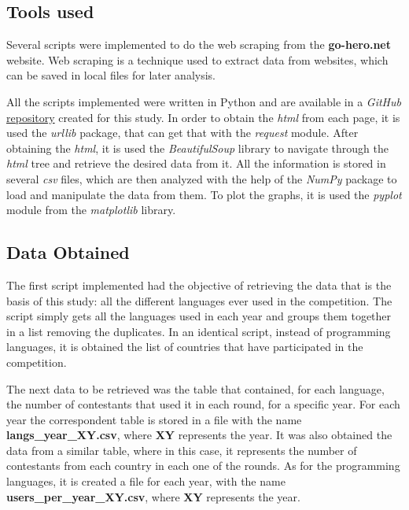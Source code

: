 \documentclass{article}
\begin{document}
\begin{multicols*}{2}
\subsection{Tools used}

Several scripts were implemented to do the web scraping from the \textbf{go-hero.net} website. Web scraping is a technique used to extract data from websites\cite{web_sc}, which can be saved in local files for later analysis.  %

All the scripts implemented were written in Python and are available in a \textit{GitHub} \href{https://github.com/Tiaghoul/iic-GoogleJamStudy}{repository} created for this study. In order to obtain the \textit{html} from each page, it is used the \textit{urllib} package, that can get that with the \textit{request} module. After obtaining the \textit{html}, it is used the \textit{BeautifulSoup} library to navigate through the \textit{html} tree and retrieve the desired data from it. All the information is stored in several \textit{csv} files, which are then analyzed with the help of the \textit{NumPy} package to load and manipulate the data from them. To plot the graphs, it is used the \textit{pyplot} module from the \textit{matplotlib} library.


\subsection{Data Obtained}

The first script implemented had the objective of retrieving the data that is the basis of this study: all the different languages ever used in the competition. The script simply gets all the languages used in each year and groups them together in a list removing the duplicates. In an identical script, instead of programming languages, it is obtained the list of countries that have participated in the competition.

The next data to be retrieved was the table that contained, for each language, the number of contestants that used it in each round, for a specific year. For each year the correspondent table is stored in a file with the name \textbf{langs\_year\_XY.csv}, where \textbf{XY} represents the year.
It was also obtained the data from a similar table, where in this case, it represents the number of contestants from each country in each one of the rounds. As for the programming languages, it is created a file for each year, with the name \textbf{users\_per\_year\_XY.csv}, where \textbf{XY} represents the year.


\end{multicols*}
\end{document}
